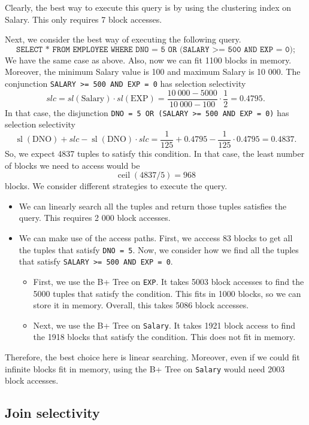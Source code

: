 \documentclass[a4paper, openany]{memoir}
\theoremstyle{definition}
\theoremstyle{plain}
\begin{document}
Clearly, the best way to execute this query is by using the clustering index on Salary. This only requires 7 block accesses.

Next, we consider the best way of executing the following query.
\[\texttt{SELECT * FROM EMPLOYEE WHERE DNO = 5 OR (SALARY >= 500 AND EXP = 0);}\]
We have the same case as above. Also, now we can fit 1100 blocks in memory. Moreover, the minimum Salary value is 100 and maximum Salary is 10 000. The conjunction \texttt{SALARY >= 500 AND EXP = 0} has selection selectivity
\[slc = sl(\text{Salary}) \cdot sl(\text{EXP}) = \frac{10 \ 000 - 5000}{10 \ 000 - 100} \cdot \frac{1}{2} = 0.4795.\]
In that case, the disjunction \texttt{DNO = 5 OR (SALARY >= 500 AND EXP = 0)} has selection selectivity
\[\operatorname{sl}(\text{DNO}) + slc - \operatorname{sl}(\text{DNO}) \cdot slc = \frac{1}{125} + 0.4795 - \frac{1}{125} \cdot 0.4795 = 0.4837.\]
So, we expect 4837 tuples to satisfy this condition. In that case, the least number of blocks we need to access would be
\[\operatorname{ceil}(4837/5) = 968\]
blocks. We consider different strategies to execute the query.
\begin{itemize}
    \item We can linearly search all the tuples and return those tuples satisfies the query. This requires 2 000 block accesses.
    \item We can make use of the access paths. First, we acccess 83 blocks to get all the tuples that satisfy \texttt{DNO = 5}. Now, we consider how we find all the tuples that satisfy \texttt{SALARY >= 500 AND EXP = 0}. 
    \begin{itemize}
        \item First, we use the B+ Tree on \texttt{EXP}. It takes 5003 block accesses to find the 5000 tuples that satisfy the condition. This fits in 1000 blocks, so we can store it in memory. Overall, this takes 5086 block accesses.
        \item Next, we use the B+ Tree on \texttt{Salary}. It takes 1921 block access to find the 1918 blocks that satisfy the condition. This does not fit in memory. 
    \end{itemize}
\end{itemize}
Therefore, the best choice here is linear searching. Moreover, even if we could fit infinite blocks fit in memory, using the B+ Tree on \texttt{Salary} would need 2003 block accesses.

\subsection{Join selectivity}
\end{document}
